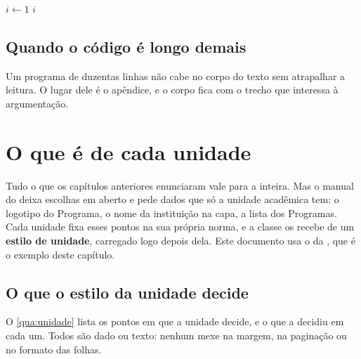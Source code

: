 \documentclass[dsc]{ufrj}
\begin{document}
  \begin{algorithm}[H]
    \caption{Busca sequencial}
    \label{alg:busca}
    $i \leftarrow 1$\;
    \KwRet $i$\;
  \end{algorithm}

  \section{Quando o código é longo demais}

  Um programa de duzentas linhas não cabe no corpo do texto sem atrapalhar a
  leitura. O lugar dele é o apêndice, e o corpo fica com o trecho que interessa à
  argumentação.

  \chapter{O que é de cada unidade}\label{cap:unidade}

  Tudo o que os capítulos anteriores enunciaram vale para a  inteira.
  Mas o manual do  deixa escolhas em aberto e pede dados que só a
  unidade acadêmica tem: o logotipo do Programa, o nome da instituição na capa,
  a lista dos Programas. Cada unidade fixa esses pontos na sua própria norma, e
  a classe os recebe de um \textbf{estilo de unidade}, carregado logo depois
  dela. Este documento usa o da , que é o exemplo deste capítulo.

  \section{O que o estilo da unidade decide}

  O \autoref{qua:unidade} lista os pontos em que a unidade decide, e o que a
   decidiu em cada um. Todos são dado ou texto: nenhum mexe na margem,
  na paginação ou no formato das folhas.
\end{document}
